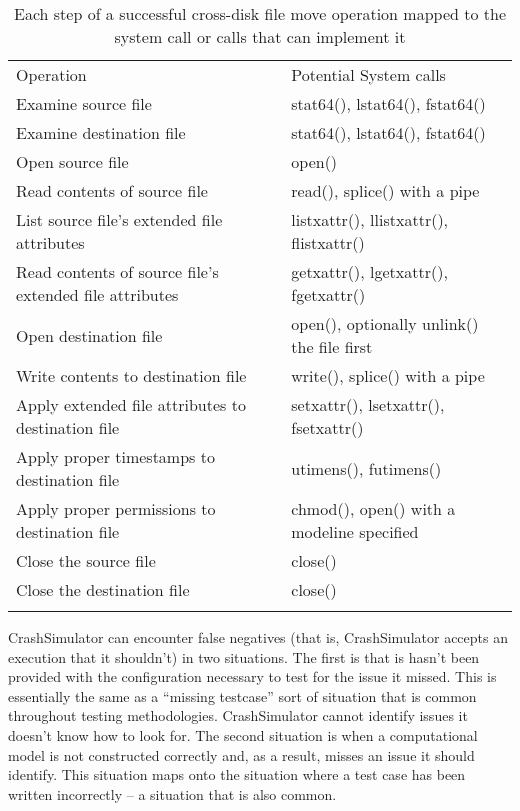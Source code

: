 \begin{table*}[t]
    \scriptsize{}
    \begin{tabular}{l | l }
    \toprule{}
      Operation                                               & Potential System calls\\
      Examine source file                                     & stat64(), lstat64(), fstat64()\\
      Examine destination file                                & stat64(), lstat64(), fstat64()\\
      Open source file                                        & open()\\
      Read contents of source file                            & read(), splice() with a pipe\\
      List source file's extended file attributes             & listxattr(), llistxattr(), flistxattr()\\
      Read contents of source file's extended file attributes & getxattr(), lgetxattr(), fgetxattr()\\
      Open destination file                                   & open(), optionally unlink() the file first\\
      Write contents to destination file                      & write(), splice() with a pipe\\
      Apply extended file attributes to destination file      & setxattr(), lsetxattr(), fsetxattr()\\
      Apply proper timestamps to destination file             & utimens(), futimens()\\
      Apply proper permissions to destination file            & chmod(), open() with a modeline specified\\
      Close the source file                                   & close()\\
      Close the destination file                              & close()\\
    \bottomrule{}
    \end{tabular}
    \caption{Each step of a successful cross-disk file move operation mapped to
      the system call or calls that can implement it}
    \label{table:stepsandcalls}
\end{table*}
    
CrashSimulator can encounter false negatives (that is, CrashSimulator accepts an
execution that it shouldn't) in two situations.  The first is that is hasn't
been provided with the configuration necessary to test for the issue it missed.
This is essentially the same as a ``missing testcase'' sort of situation that is
common throughout testing methodologies.  CrashSimulator cannot identify issues
it doesn't know how to look for.  The second situation is when a computational
model is not constructed correctly and, as a result, misses an issue it should
identify.  This situation maps onto the situation where a test case has been
written incorrectly -- a situation that is also common.

